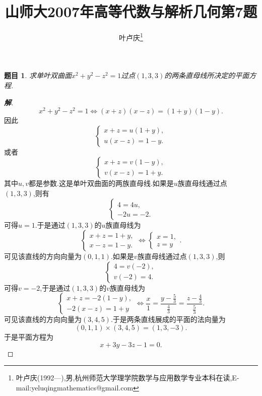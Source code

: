 \documentclass[a4paper]{article}
\newtheorem*{exe}{题目}
\newenvironment{exercise}
{\bigskip\begin{mdframed}\begin{exe}}
    {\end{exe}\end{mdframed}\bigskip}
\begin{document}
\title{\huge{\bf{山师大2007年高等代数与解析几何第7题}}} \author{\small{叶卢庆\footnote{叶卢庆(1992---),男,杭州师范大学理学院数学与应用数学专业本科在读,E-mail:yeluqingmathematics@gmail.com}}}
\maketitle
\begin{exercise}
求单叶双曲面$x^2+y^2-z^2=1$过点$(1,3,3)$的两条直母线所决定的平面方程.
\end{exercise}
\begin{proof}[\textbf{解}]
$$
x^2+y^2-z^2=1\iff (x+z)(x-z)=(1+y)(1-y).
$$
因此
$$
\begin{cases}
  x+z=u(1+y),\\
u(x-z)=1-y.
\end{cases}
$$
或者
$$
\begin{cases}
  x+z=v(1-y),\\
v(x-z)=1+y.
\end{cases}
$$
其中$u,v$都是参数.这是单叶双曲面的两族直母线.如果是$u$族直母线通过点
$(1,3,3)$,则有
$$
\begin{cases}
  4=4u,\\
-2u=-2.
\end{cases}
$$
可得$u=1$.于是通过$(1,3,3)$的$u$族直母线为
$$
\begin{cases}
  x+z=1+y,\\
x-z=1-y.
\end{cases}\iff
\begin{cases}
  x=1,\\
z=y
\end{cases}.
$$
可见该直线的方向向量为$(0,1,1)$.如果是$v$族直母线通过点$(1,3,3)$,则
$$
\begin{cases}
  4=v(-2),\\
v(-2)=4.
\end{cases}
$$
可得$v=-2$,于是通过$(1,3,3)$的$v$族直母线为
$$
\begin{cases}
  x+z=-2(1-y),\\
-2(x-z)=1+y
\end{cases}\iff \frac{x}{1}=\frac{y-\frac{5}{3}}{\frac{4}{3}}=\frac{z-\frac{4}{3}}{\frac{5}{3}}.
$$
可见该直线的方向向量为$(3,4,5)$.于是两条直线展成的平面的法向量为
$$
(0,1,1)\times (3,4,5)=(1,3,-3).
$$
于是平面方程为
$$
x+3y-3z-1=0.
$$
\end{proof}
\end{document}
